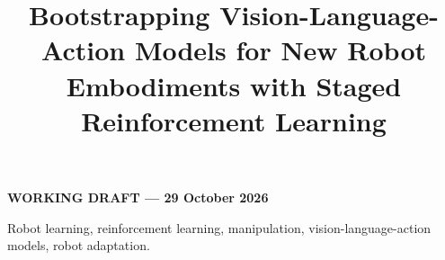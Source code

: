 \documentclass[letterpaper,journal]{IEEEtran}
\begin{document}
\title{Bootstrapping Vision-Language-Action Models for New Robot Embodiments with Staged Reinforcement Learning}
\author{}
\IEEEaftertitletext{\vspace{1em}}
\maketitle
\begin{center}\small\textbf{WORKING DRAFT --- 29 October 2026}\end{center}

\begin{IEEEkeywords}
Robot learning, reinforcement learning, manipulation, vision-language-action models, robot adaptation.
\end{IEEEkeywords}








\end{document}
